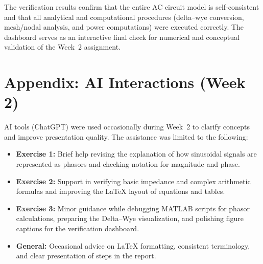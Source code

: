 \documentclass{article}
\begin{document}
The verification results confirm that the entire AC circuit model is
self-consistent and that all analytical and computational procedures (delta–wye
conversion, mesh/nodal analysis, and power computations) were executed
correctly. The dashboard serves as an interactive final check for numerical
and conceptual validation of the Week~2 assignment.



\appendix
\section*{Appendix: AI Interactions (Week 2)}

AI tools (ChatGPT) were used occasionally during Week~2 to clarify concepts
and improve presentation quality. The assistance was limited to the following:

\begin{itemize}
    \item \textbf{Exercise 1:} Brief help revising the explanation of how
    sinusoidal signals are represented as phasors and checking notation for
    magnitude and phase.
    \item \textbf{Exercise 2:} Support in verifying basic impedance and complex
    arithmetic formulas and improving the LaTeX layout of equations and tables.
    \item \textbf{Exercise 3:} Minor guidance while debugging MATLAB scripts for
    phasor calculations, preparing the Delta–Wye visualization, and polishing
    figure captions for the verification dashboard.
    \item \textbf{General:} Occasional advice on LaTeX formatting, consistent
    terminology, and clear presentation of steps in the report.
\end{itemize}
\end{document}
